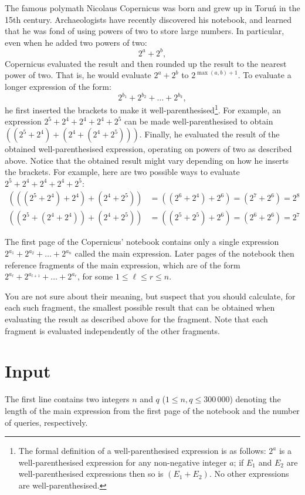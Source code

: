 The famous polymath Nicolaus Copernicus was born and grew up in Toruń in the 15th century.
Archaeologists have recently discovered his notebook, and learned that he was fond of using
powers of two to store large numbers. In particular, even when he added two powers of two:
\[2^{a} + 2^{b},\]
Copernicus evaluated the result and then rounded up
the result to the nearest power of two. That is, he would evaluate $2^{a}+2^{b}$ to
$2^{\max(a,b)+1}$.
To evaluate a longer expression of the form:
\[2^{b_{1}} + 2^{b_{2}} + \ldots + 2^{b_{k}},\]
he first inserted the brackets to make it well-parenthesised\footnote{
The formal definition of a well-parenthesised expression is as follows: $2^{a}$ is a well-parenthesised
expression for any non-negative integer $a$; if $E_{1}$ and $E_{2}$ are well-parenthesised expressions then so is $(E_{1}+E_{2})$.
No other expressions are well-parenthesised.}.
For example,
an expression $2^{5} + 2^{4} + 2^{4} + 2^{4} + 2^{5}$ can be made well-parenthesised to
obtain $((2^{5} + 2^{4}) + (2^{4} +(2^{4} + 2^{5})))$. Finally, he evaluated the result of the
obtained well-parenthesised expression, operating on powers of two as described above.
Notice that the obtained result might vary depending on how he inserts the brackets.
For example, here are two possible ways to evaluate $2^{5} + 2^{4} + 2^{4} + 2^{4} + 2^{5}$:
\begin{align*}
(((2^{5} + 2^{4}) + 2^{4}) + (2^{4} + 2^{5})) &=
((2^{6} + 2^{4}) + 2^{6}) = (2^{7} + 2^{6}) =  2^{8} \\
((2^{5} + (2^{4} + 2^{4})) + (2^{4} + 2^{5})) &=
((2^{5} + 2^{5}) + 2^{6}) = (2^{6}+2^{6}) = 2^{7}
\end{align*}

The first page of the Copernicus' notebook contains only a single expression
$2^{a_{1}}+2^{a_{2}}+\ldots+2^{a_{n}}$
called the main expression.
Later pages of the notebook then reference fragments of the main expression,
which are of the form $2^{a_{\ell}}+2^{a_{l+1}} + \ldots + 2^{a_{r}}$,
for some $1 \leq \ell \leq r \leq n$.

You are not sure about their meaning, but suspect that you should calculate,
for each such fragment, the smallest possible result that can be obtained when evaluating
the result as described above for the fragment. Note that each fragment is
evaluated independently of the other fragments.

\section*{Input}
The first line contains two integers $n$ and $q$ ($1\leq n, q\leq 300\,000$) denoting the
length of the main expression from the first page of the notebook and the number of queries, respectively.

